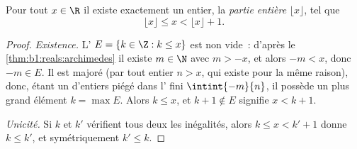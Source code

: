 \begin{theorem}\label{thm:b1:reals:floor}
Pour tout $x \in \R$ il existe exactement un entier, la \emph{partie
entière} $\lfloor x \rfloor$, tel que
\[
\lfloor x \rfloor \leq x < \lfloor x \rfloor + 1 .
\]
\end{theorem}

\begin{proof}
\emph{Existence.} L' $E = \{k \in \Z : k \leq x\}$ est non
vide~: d'après le \cref{thm:b1:reals:archimedes} il existe $m \in \N$
avec $m > -x$, et alors $-m < x$, donc $-m \in E$. Il est majoré (par
tout entier $n > x$, qui existe pour la même raison), donc, étant un
 d'entiers piégé dans l' fini $\intint{-m}{n}$, il
possède un plus grand élément $k = \max E$. Alors $k \leq x$, et $k +
1 \notin E$ signifie $x < k + 1$.

\emph{Unicité.} Si $k$ et $k'$ vérifient tous deux les inégalités,
alors $k \leq x < k' + 1$ donne $k \leq k'$, et symétriquement $k'
\leq k$.
\end{proof}


